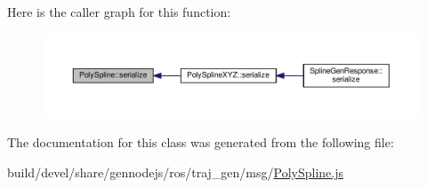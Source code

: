 Here is the caller graph for this function\+:
\nopagebreak
\begin{figure}[H]
\begin{center}
\leavevmode
\includegraphics[width=350pt]{class_poly_spline_a84b8da4742dcf2b5e836760ab7d32293_icgraph}
\end{center}
\end{figure}




The documentation for this class was generated from the following file\+:\begin{DoxyCompactItemize}
\item 
build/devel/share/gennodejs/ros/traj\+\_\+gen/msg/\hyperlink{_poly_spline_8js}{Poly\+Spline.\+js}\end{DoxyCompactItemize}
